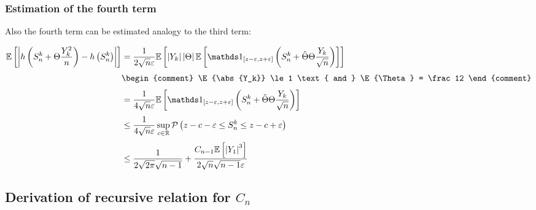 \subsubsection{Estimation of the fourth term}

Also the fourth term can be estimated analogy to the third term:

\begin{align}
  \E{\abs{ \h{ S_n^k+\Theta\frac{Y_k^2}{n} } - \h{ S_n^k } }}
  &= \frac{1}{2\sqrt n \epsilon} \E{ \abs{Y_k} \abs{\Theta} \E{ \cf[z-\epsilon]{z+\epsilon}{S_n^k + \tilde \Theta\Theta\frac{Y_k}{\sqrt n}} } } \nl
  &
  \begin{comment}
    \E{\abs{Y_k}} \le 1 \text{ and } \E{\Theta} = \frac 12
  \end{comment} \nl
  &= \frac{1}{4\sqrt n \epsilon} \E{ \cf[z-\epsilon]{z+\epsilon}{S_n^k + \tilde \Theta\Theta\frac{Y_k}{\sqrt n}} } \nl
  & \le \frac{1}{4\sqrt n \epsilon} \sup_{c\in\R} \P{z-c-\epsilon \le S_n^k \le z-c+\epsilon} \nl
  &\le \frac{1}{2\sqrt{2\pi}\sqrt{n-1}} + \frac{C_{n-1} \E{\abs{Y_1}^3} }{2\sqrt  n\sqrt{n-1}\epsilon}
\end{align}

\subsection{Derivation of recursive relation for $C_n$}

